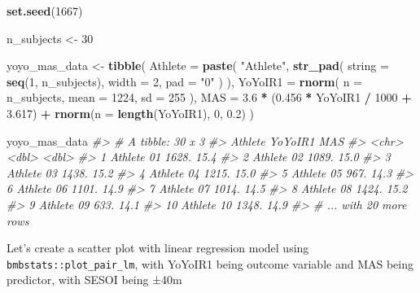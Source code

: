 \documentclass[
]{book}
\newenvironment{Shaded}{\begin{snugshade}}{\end{snugshade}}
\newcommand{\CommentTok}[1]{\textcolor[rgb]{0.56,0.35,0.01}{\textit{#1}}}
\newcommand{\DataTypeTok}[1]{\textcolor[rgb]{0.13,0.29,0.53}{#1}}
\newcommand{\DecValTok}[1]{\textcolor[rgb]{0.00,0.00,0.81}{#1}}
\newcommand{\FloatTok}[1]{\textcolor[rgb]{0.00,0.00,0.81}{#1}}
\newcommand{\KeywordTok}[1]{\textcolor[rgb]{0.13,0.29,0.53}{\textbf{#1}}}
\newcommand{\NormalTok}[1]{#1}
\newcommand{\OperatorTok}[1]{\textcolor[rgb]{0.81,0.36,0.00}{\textbf{#1}}}
\newcommand{\StringTok}[1]{\textcolor[rgb]{0.31,0.60,0.02}{#1}}
\begin{document}
\begin{Shaded}
\begin{Highlighting}[]
\KeywordTok{set.seed}\NormalTok{(}\DecValTok{1667}\NormalTok{)}

\NormalTok{n\_subjects <{-}}\StringTok{ }\DecValTok{30}

\NormalTok{yoyo\_mas\_data <{-}}\StringTok{ }\KeywordTok{tibble}\NormalTok{(}
  \DataTypeTok{Athlete =} \KeywordTok{paste}\NormalTok{(}
    \StringTok{"Athlete"}\NormalTok{,}
    \KeywordTok{str\_pad}\NormalTok{(}
      \DataTypeTok{string =} \KeywordTok{seq}\NormalTok{(}\DecValTok{1}\NormalTok{, n\_subjects),}
      \DataTypeTok{width =} \DecValTok{2}\NormalTok{,}
      \DataTypeTok{pad =} \StringTok{"0"}
\NormalTok{    )}
\NormalTok{  ),}
  \StringTok{\textasciigrave{}}\DataTypeTok{YoYoIR1}\StringTok{\textasciigrave{}}\NormalTok{ =}\StringTok{ }\KeywordTok{rnorm}\NormalTok{(}
    \DataTypeTok{n =}\NormalTok{ n\_subjects,}
    \DataTypeTok{mean =} \DecValTok{1224}\NormalTok{,}
    \DataTypeTok{sd =} \DecValTok{255}
\NormalTok{  ),}
  \StringTok{\textasciigrave{}}\DataTypeTok{MAS}\StringTok{\textasciigrave{}}\NormalTok{ =}\StringTok{ }\FloatTok{3.6} \OperatorTok{*}\StringTok{ }\NormalTok{(}\FloatTok{0.456} \OperatorTok{*}\StringTok{ \textasciigrave{}}\DataTypeTok{YoYoIR1}\StringTok{\textasciigrave{}} \OperatorTok{/}\StringTok{ }\DecValTok{1000} \OperatorTok{+}\StringTok{ }\FloatTok{3.617}\NormalTok{) }\OperatorTok{+}
\StringTok{    }\KeywordTok{rnorm}\NormalTok{(}\DataTypeTok{n =} \KeywordTok{length}\NormalTok{(}\StringTok{\textasciigrave{}}\DataTypeTok{YoYoIR1}\StringTok{\textasciigrave{}}\NormalTok{), }\DecValTok{0}\NormalTok{, }\FloatTok{0.2}\NormalTok{)}
\NormalTok{)}

\NormalTok{yoyo\_mas\_data}
\CommentTok{\#> \# A tibble: 30 x 3}
\CommentTok{\#>    Athlete    YoYoIR1   MAS}
\CommentTok{\#>    <chr>        <dbl> <dbl>}
\CommentTok{\#>  1 Athlete 01   1628.  15.4}
\CommentTok{\#>  2 Athlete 02   1089.  15.0}
\CommentTok{\#>  3 Athlete 03   1438.  15.2}
\CommentTok{\#>  4 Athlete 04   1215.  15.0}
\CommentTok{\#>  5 Athlete 05    967.  14.3}
\CommentTok{\#>  6 Athlete 06   1101.  14.9}
\CommentTok{\#>  7 Athlete 07   1014.  14.5}
\CommentTok{\#>  8 Athlete 08   1424.  15.2}
\CommentTok{\#>  9 Athlete 09    633.  14.1}
\CommentTok{\#> 10 Athlete 10   1348.  14.9}
\CommentTok{\#> \# ... with 20 more rows}
\end{Highlighting}
\end{Shaded}

Let's create a scatter plot with linear regression model using \texttt{bmbstats::plot\_pair\_lm}, with YoYoIR1 being outcome variable and MAS being predictor, with SESOI being ±40m
\end{document}
